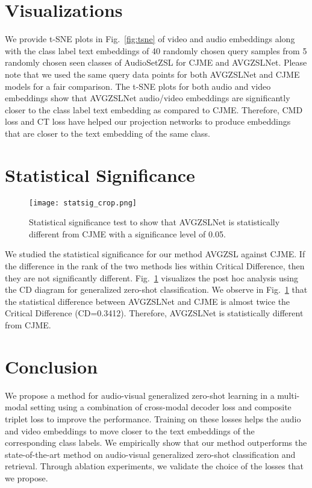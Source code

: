 \documentclass[10pt,twocolumn,letterpaper]{article}
\begin{document}
\section{Visualizations}

We provide t-SNE plots in Fig.~\ref{fig:tsne} of video and audio embeddings along with the class label text embeddings of 40 randomly chosen query samples from 5 randomly chosen seen classes of AudioSetZSL for CJME and AVGZSLNet. Please note that we used the same query data points for both AVGZSLNet and CJME models for a fair comparison. The t-SNE plots for both audio and video embeddings show that AVGZSLNet audio/video embeddings are significantly closer to the class label text embedding as compared to CJME. Therefore, CMD loss and CT loss have helped our projection networks to produce embeddings that are closer to the text embedding of the same class.


\section{Statistical Significance}
\begin{figure}[t]
  \centering
  \texttt{[image: statsig\_crop.png]}
\caption{Statistical significance test to show that AVGZSLNet is statistically different from CJME with a significance level of 0.05.}
\label{fig:statsig}
  \vspace{-15pt}
\end{figure}

We studied the statistical significance \cite{demvsar2006statistical} for our method AVGZSL against CJME. If the difference in the rank of the two methods lies within Critical Difference, then they are not significantly different. Fig.~\ref{fig:statsig} visualizes the post hoc analysis using the CD diagram for generalized zero-shot classification. We observe in Fig.~\ref{fig:statsig} that the statistical difference between AVGZSLNet and CJME is almost twice the Critical Difference (CD=0.3412). Therefore, AVGZSLNet is statistically different from CJME. 

\section{Conclusion}
We propose a method for audio-visual generalized zero-shot learning in a multi-modal setting using a combination of cross-modal decoder loss and composite triplet loss to improve the performance. Training on these losses helps the audio and video embeddings to move closer to the text embeddings of the corresponding class labels. We empirically show that our method outperforms the state-of-the-art method on audio-visual generalized zero-shot classification and retrieval. Through ablation experiments, we validate the choice of the losses that we propose.

{\small


}
\end{document}
